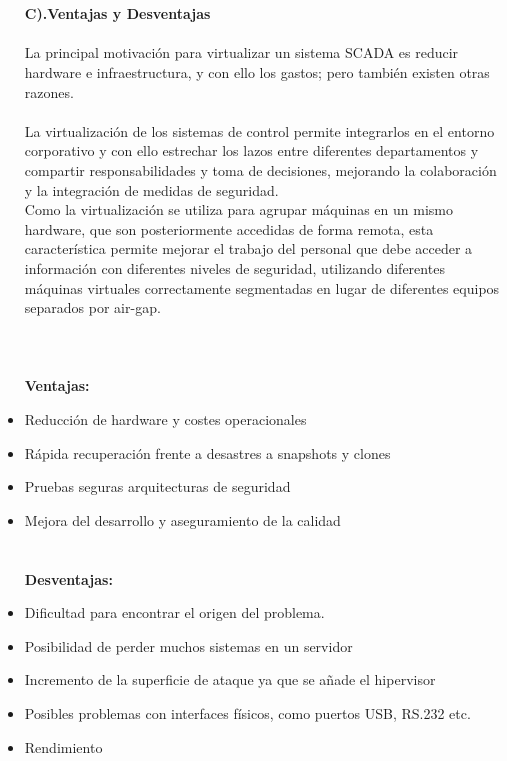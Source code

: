 \documentclass[twoside,twocolumn]{article}
\begin{document}
\begin{flushright}
\begin{itemize}
\textbf{}\\
\textbf{}\\
 \textbf{C).Ventajas y Desventajas}\\
\textbf{}\\
La principal motivación para virtualizar un sistema SCADA es reducir hardware e infraestructura, y con ello los gastos; pero también existen otras razones.\textbf{}\\
\textbf{}\\
La virtualización de los sistemas de control permite integrarlos en el entorno corporativo y con ello estrechar los lazos entre diferentes departamentos y compartir responsabilidades y toma de decisiones, mejorando la colaboración y la integración de medidas de seguridad.
\textbf{}\\
Como la virtualización se utiliza para agrupar máquinas en un mismo hardware, que son posteriormente accedidas de forma remota, esta característica permite mejorar el trabajo del personal que debe acceder a información con diferentes niveles de seguridad, utilizando diferentes máquinas virtuales correctamente segmentadas en lugar de diferentes equipos separados por air-gap.
\textbf{}\\
\textbf{}\\
\textbf{}\\
\textbf{}\\
\textbf{Ventajas: }\\
\item	Reducción de hardware y costes operacionales
\item	Rápida recuperación frente a desastres a snapshots y clones
\item	Pruebas seguras arquitecturas de seguridad
\item	Mejora del desarrollo y aseguramiento de la calidad
\textbf{}\\
\textbf{}\\
\textbf{}\\
\textbf{Desventajas:}\\

\item	Dificultad para encontrar el origen del problema.
\item	Posibilidad de perder muchos sistemas en un servidor
\item	Incremento de la superficie de ataque ya que se añade el hipervisor
\item	Posibles problemas con interfaces físicos, como puertos USB, RS.232 etc.
\item	Rendimiento




\end{itemize}
\end{flushright}
\end{document}
